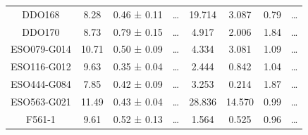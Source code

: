 \documentclass[reprint,%
 amsmath,amssymb,
 aps,
]{revtex4-1}
\begin{document}
\begin{longtable*}{|c|c|c|c|c|c|c|c| }
DDO168               & 8.28                      & 0.46 ± 0.11           & …                      & 19.714                                                       & 3.087                                                           & 0.79                                                          & …                                                             \\
DDO170               & 8.73                      & 0.79 ± 0.15           & …                      & 4.917                                                        & 2.006                                                            & 1.84                                                           & …                                                             \\
ESO079-G014          & 10.71                     & 0.50 ± 0.09           & …                      & 4.334                                                        & 3.081                                                          & 1.09                                                            & …                                                             \\
ESO116-G012          & 9.63                      & 0.35 ± 0.04           & …                      & 2.444                                                        & 0.842                                                        & 1.04                                                          & …                                                             \\
ESO444-G084          & 7.85                      & 0.42 ± 0.09           & …                      & 3.253                                                        & 0.214                                                          & 1.87                                                           & …                                                             \\
ESO563-G021          & 11.49                     & 0.43 ± 0.04           & …                      & 28.836                                                       & 14.570                                                          & 0.99                                                          & …                                                             \\
F561-1               & 9.61                      & 0.52 ± 0.13           & …                      & 1.564                                                        & 0.525                                                          & 0.96                                                          & …                                                             \\

\end{longtable*}
\end{document}
